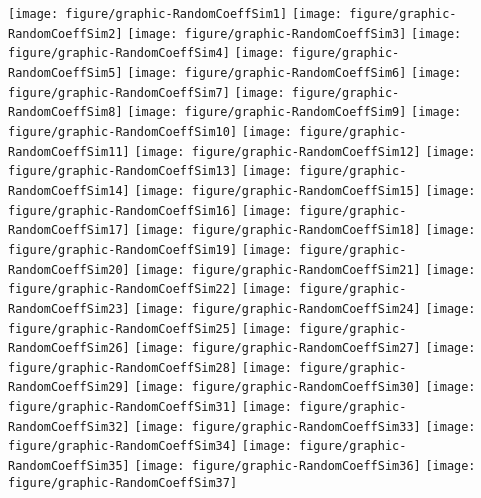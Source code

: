 \documentclass[12pt,letterpaper,oneside]{article}\usepackage{graphicx, color}
\newenvironment{knitrout}{}{} %
\begin{document}
\begin{knitrout}
{\centering \texttt{[image: figure/graphic-RandomCoeffSim1]} 
\texttt{[image: figure/graphic-RandomCoeffSim2]} 
\texttt{[image: figure/graphic-RandomCoeffSim3]} 
\texttt{[image: figure/graphic-RandomCoeffSim4]} 
\texttt{[image: figure/graphic-RandomCoeffSim5]} 
\texttt{[image: figure/graphic-RandomCoeffSim6]} 
\texttt{[image: figure/graphic-RandomCoeffSim7]} 
\texttt{[image: figure/graphic-RandomCoeffSim8]} 
\texttt{[image: figure/graphic-RandomCoeffSim9]} 
\texttt{[image: figure/graphic-RandomCoeffSim10]} 
\texttt{[image: figure/graphic-RandomCoeffSim11]} 
\texttt{[image: figure/graphic-RandomCoeffSim12]} 
\texttt{[image: figure/graphic-RandomCoeffSim13]} 
\texttt{[image: figure/graphic-RandomCoeffSim14]} 
\texttt{[image: figure/graphic-RandomCoeffSim15]} 
\texttt{[image: figure/graphic-RandomCoeffSim16]} 
\texttt{[image: figure/graphic-RandomCoeffSim17]} 
\texttt{[image: figure/graphic-RandomCoeffSim18]} 
\texttt{[image: figure/graphic-RandomCoeffSim19]} 
\texttt{[image: figure/graphic-RandomCoeffSim20]} 
\texttt{[image: figure/graphic-RandomCoeffSim21]} 
\texttt{[image: figure/graphic-RandomCoeffSim22]} 
\texttt{[image: figure/graphic-RandomCoeffSim23]} 
\texttt{[image: figure/graphic-RandomCoeffSim24]} 
\texttt{[image: figure/graphic-RandomCoeffSim25]} 
\texttt{[image: figure/graphic-RandomCoeffSim26]} 
\texttt{[image: figure/graphic-RandomCoeffSim27]} 
\texttt{[image: figure/graphic-RandomCoeffSim28]} 
\texttt{[image: figure/graphic-RandomCoeffSim29]} 
\texttt{[image: figure/graphic-RandomCoeffSim30]} 
\texttt{[image: figure/graphic-RandomCoeffSim31]} 
\texttt{[image: figure/graphic-RandomCoeffSim32]} 
\texttt{[image: figure/graphic-RandomCoeffSim33]} 
\texttt{[image: figure/graphic-RandomCoeffSim34]} 
\texttt{[image: figure/graphic-RandomCoeffSim35]} 
\texttt{[image: figure/graphic-RandomCoeffSim36]} 
\texttt{[image: figure/graphic-RandomCoeffSim37]} 
}
\end{knitrout}
\end{document}

